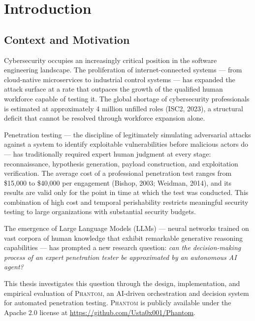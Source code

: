 \documentclass[12pt,a4paper,oneside,openany]{book}
\newcommand{\Phantom}{\textsc{Phantom}}
\begin{document}
\mainmatter
{}

\chapter{Introduction}

\section{Context and Motivation}

Cybersecurity occupies an increasingly critical position in the software engineering landscape. The proliferation of internet-connected systems — from cloud-native microservices to industrial control systems — has expanded the attack surface at a rate that outpaces the growth of the qualified human workforce capable of testing it. The global shortage of cybersecurity professionals is estimated at approximately 4 million unfilled roles (ISC2, 2023), a structural deficit that cannot be resolved through workforce expansion alone.

Penetration testing — the discipline of legitimately simulating adversarial attacks against a system to identify exploitable vulnerabilities before malicious actors do — has traditionally required expert human judgment at every stage: reconnaissance, hypothesis generation, payload construction, and exploitation verification. The average cost of a professional penetration test ranges from \$15,000 to \$40,000 per engagement (Bishop, 2003; Weidman, 2014), and its results are valid only for the point in time at which the test was conducted. This combination of high cost and temporal perishability restricts meaningful security testing to large organizations with substantial security budgets.

The emergence of Large Language Models (LLMs) — neural networks trained on vast corpora of human knowledge that exhibit remarkable generative reasoning capabilities — has prompted a new research question: \textit{can the decision-making process of an expert penetration tester be approximated by an autonomous AI agent?}

This thesis investigates this question through the design, implementation, and empirical evaluation of \Phantom{}, an AI-driven orchestration and decision system for automated penetration testing. \Phantom{} is publicly available under the Apache 2.0 license at \url{https://github.com/Usta0x001/Phantom}.
\end{document}
